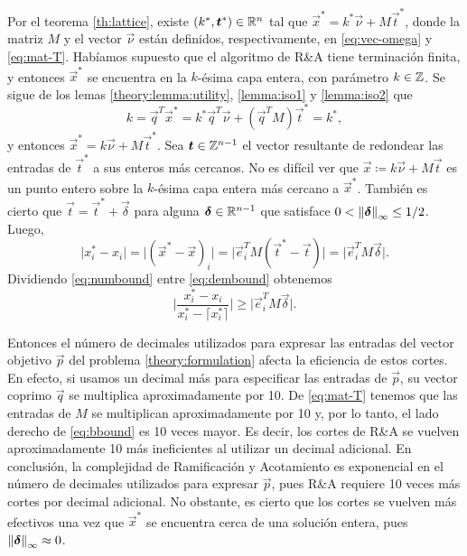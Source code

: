 
Por el teorema \ref{th:lattice}, existe $(k^*, \boldsymbol{t}^*) \in \mathbb{R}^n$ tal que $\vec{x}^* =
k^*\vec{\nu} + M\vec{t}^*$, donde la matriz $M$ y el vector $\vec{\nu}$ están definidos,
respectivamente, en \eqref{eq:vec-omega} y \eqref{eq:mat-T}. Habíamos supuesto que el algoritmo de
R\&A tiene terminación finita, y entonces $\vec{x}^*$ se encuentra en la $k$-ésima capa entera, con
parámetro $k \in \mathbb{Z}$. Se sigue de los lemas \ref{theory:lemma:utility}, \ref{lemma:iso1} y \ref{lemma:iso2}
que
\begin{equation*}
	k = \vec{q}^T\vec{x}^* = k^*\vec{q}^T\vec{\nu} + \left(\vec{q}^TM\right)\vec{t}^* = k^*,
\end{equation*}
y entonces $\vec{x}^* = k\vec{\nu} + M\vec{t}^*$. Sea $\boldsymbol{t} \in \mathbb{Z}^{n-1}$ el vector resultante de
redondear las entradas de $\vec{t}^*$ a sus enteros más cercanos. No es difícil ver que $\vec{x}
\coloneq k\vec{\nu} + M\vec{t}$ es un punto entero sobre la $k$-ésima capa entera más cercano a
$\vec{x}^*$. También es cierto que $\vec{t} = \vec{t}^* + \vec{\delta}$ para alguna $\boldsymbol{\delta}
\in \mathbb{R}^{n-1}$ que satisface $0 < \left\lVert \boldsymbol{\delta} \right\rVert_\infty \leq 1/2$. Luego,
\begin{equation}
	\label{eq:numbound}
	\big| x^*_i - x_i \big| =
	\big| \left(\vec{x}^* - \vec{x}\right)_i \big| =
	\big| \vec{e}_i^TM\left(\vec{t}^* - \vec{t}\right) \big| =
	\big| \vec{e}_i^TM\vec{\delta} \big|.
\end{equation}
Dividiendo \eqref{eq:numbound} entre \eqref{eq:dembound} obtenemos
\begin{equation}
	\label{eq:bbound}
	\bigg| \frac{x_i^* - x_i}{x_i^* - \big\lceil x_i^*\big\rceil} \bigg|
	\geq \big|\vec{e}_i^TM\vec{\delta}\big|.
\end{equation}

Entonces el número de decimales utilizados para expresar las entradas del vector objetivo $\vec{p}$
del problema \eqref{theory:formulation} afecta la eficiencia de estos cortes. En efecto, si usamos
un decimal más para especificar las entradas de $\vec{p}$, su vector coprimo $\vec{q}$ se multiplica
aproximadamente por 10. De \eqref{eq:mat-T} tenemos que las entradas de $M$ se multiplican
aproximadamente por 10 y, por lo tanto, el lado derecho de \eqref{eq:bbound} es 10 veces mayor. Es
decir, los cortes de R\&A se vuelven aproximadamente 10 más ineficientes al utilizar un decimal
adicional. En conclusión, la complejidad de Ramificación y Acotamiento es exponencial en el número
de decimales utilizados para expresar $\vec{p}$, pues R\&A requiere 10 veces más cortes por decimal
adicional. No obstante, es cierto que los cortes se vuelven más efectivos una vez que $\vec{x}^*$ se
encuentra cerca de una solución entera, pues $\left\lVert \boldsymbol{\delta} \right\rVert_\infty \approx 0$.

